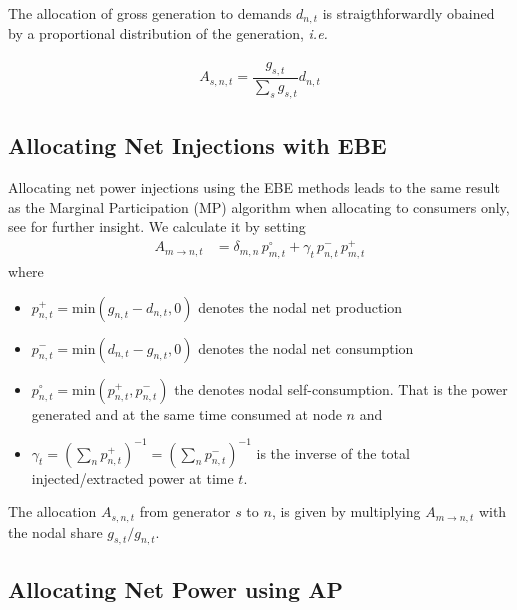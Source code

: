 \documentclass[11pt,twocolumn]{article}
\newcommand{\ie}{\textit{i.e.} }
\newcommand{\generation}{g_{s,t}}
\newcommand{\nodalgeneration}[1][n]{g_{#1,t}}
\newcommand{\demand}[1][n]{d_{#1,t}}
\newcommand{\nodaldemand}[1][n]{d_{#1,t}}
\newcommand{\injection}{p_{n,t}}
\newcommand{\netconsumption}[1][n]{p^{-}_{#1,t}}
\newcommand{\netproduction}[1][n]{p^{+}_{#1,t}}
\newcommand{\selfconsumption}[1][n]{p^{\circ}_{#1,t}}
\newcommand{\allocategeneration}[1][s, n]{A_{#1,t}}
\newcommand{\allocatepeer}[1][m \rightarrow n]{A_{#1,t}}
\begin{document}
The allocation of gross generation to demands $\demand$ is straigthforwardly obained by a proportional distribution of the generation, \ie

\begin{align}
    \allocategeneration = \dfrac{\generation}{\sum_s \generation} \demand 
\end{align}


\subsection{Allocating Net Injections with EBE}
\label{sec:net_ebe}

Allocating net power injections using the EBE methods leads to the same result as the Marginal Participation (MP) \cite{rudnick_marginal_1995}  algorithm when allocating to consumers only, see \cite{hofmann_flow_2020-1} for further insight. We calculate it by setting 
\begin{align}
\allocatepeer &=  \delta_{m,n}\,\selfconsumption[m] + \gamma_t \, \netconsumption  \, \netproduction[m]
\label{eq:mp_slack}
\end{align}
where 
\begin{itemize}
\item $\netproduction = \text{min}\left( \nodalgeneration - \nodaldemand , 0 \right) $ denotes the nodal net production 
\item $\netconsumption = \text{min}\left( \nodaldemand  - \nodalgeneration, 0 \right)$ denotes the nodal net consumption
\item $\selfconsumption = \text{min}\left( \netproduction, \netconsumption \right)$ the denotes  nodal self-consumption. That is the power generated and at the same time consumed at node $n$ and 
\item $\gamma_t = \left( \sum_n \netproduction\right) ^{-1} = \left( \sum_n \netconsumption\right) ^{-1}$ is the inverse of the total injected/extracted power at time $t$.
\end{itemize}

The allocation $\allocategeneration$ from generator $s$ to $n$, is given by multiplying $\allocatepeer$ with the nodal share $\generation / \nodalgeneration$.


\subsection{Allocating Net Power using AP}
\label{sec:net_ap}
\end{document}
